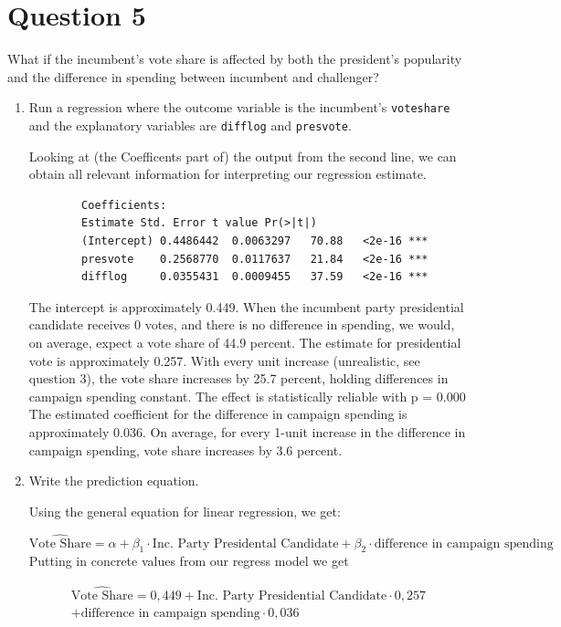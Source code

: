 \documentclass[12pt,letterpaper]{article}
\begin{document}
\section*{Question 5}
\noindent What if the incumbent's vote share is affected by both the president's popularity and the difference in spending between incumbent and challenger? 
	\begin{enumerate}
		\item Run a regression where the outcome variable is the incumbent's \texttt{voteshare} and the explanatory variables are \texttt{difflog} and \texttt{presvote}.
		
		
		Looking at (the Coefficents part of) the output from the second line, we can obtain all relevant information for interpreting our regression estimate.
		
		\begin{verbatim}
		Coefficients:
		Estimate Std. Error t value Pr(>|t|)    
		(Intercept) 0.4486442  0.0063297   70.88   <2e-16 ***
		presvote    0.2568770  0.0117637   21.84   <2e-16 ***
		difflog     0.0355431  0.0009455   37.59   <2e-16 ***		
		\end{verbatim}
		
		The intercept is approximately 0.449. When the incumbent party presidential candidate receives 0 votes, and there is no difference in spending, we would, on average, expect a vote share of 44.9 percent.
		The estimate for presidential vote is approximately 0.257. With every unit increase (unrealistic, see question 3), the vote share increases by 25.7 percent, holding differences in campaign spending constant. The effect is statistically reliable with p = 0.000 
		The estimated coefficient for the difference in campaign spending is approximately 0.036. On average, for every 1-unit increase in the difference in campaign spending, vote share increases by 3.6 percent.
		\vspace{0.5cm}
		\item Write the prediction equation.	
		
		Using the general equation for linear regression, we get:

		\[\widehat{\text{Vote Share}} = \alpha + \beta_1 \cdot \text{Inc. Party Presidental Candidate} + \beta_2 \cdot \text{difference in campaign spending}\]
		Putting in concrete values from our regress model we get
		
		\begin{multline*}
			\widehat{\text{Vote Share}} = 0{,}449 
			+ \text{Inc. Party Presidential Candidate} \cdot 0{,}257 \\
			+ \text{difference in campaign spending} \cdot 0{,}036
		\end{multline*}




\end{enumerate}
\end{document}
